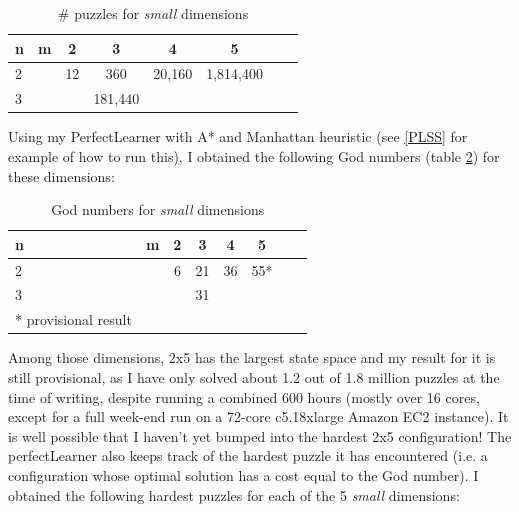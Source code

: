 \begin{table}[H]
\begin{center}
\begin{tabular}{l*{6}{c}r}
n              & m & 2 & 3 & 4 & 5\\
\hline
2              &   & 12 & 360 & 20,160 & 1,814,400 \\
3              &   &   & 181,440 &  &    \\
\end{tabular}
\caption{\label{tab:smallSP}\# puzzles for \textit{small} dimensions}
\end{center}
\end{table}
\noindent Using my PerfectLearner with A* and Manhattan heuristic (see \ref{PLSS} for example of how to run this), I obtained the following God numbers (table \ref{tab:smallSPGN}) for these dimensions:
\begin{table}[H]
\begin{center}
\begin{tabular}{l*{6}{c}r}
n              & m & 2 & 3 & 4 & 5\\
\hline
2              &   & 6 & 21 & 36 & 55* \\
3              &   &   & 31 &  &    \\
* \tiny{provisional result}
\end{tabular}
\caption{\label{tab:smallSPGN}God numbers for \textit{small} dimensions}
\end{center}
\end{table}
\noindent Among those dimensions, 2x5 has the largest state space and my result for it is still provisional, as I have only solved about 1.2 out of 1.8 million puzzles at the time of writing, despite running a combined 600 hours (mostly over 16 cores, except for a full week-end run on a 72-core c5.18xlarge Amazon EC2 instance). It is well possible that I haven't yet bumped into the hardest 2x5 configuration! The perfectLearner also keeps track of the hardest puzzle it has encountered (i.e. a configuration whose optimal solution has a cost equal to the God number). I obtained the following hardest puzzles for each of the 5 \textit{small} dimensions:
\\
\begin{three}
\centering
{}
\end{three}
\begin{five}
\end{five}
\begin{seven}
\end{seven}
\begin{nine}
\end{nine}
\begin{eight}
\end{eight}


